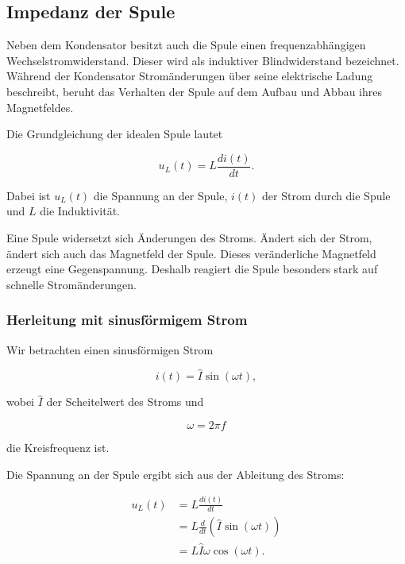 \subsection{Impedanz der Spule}
\label{subsec:impedanz-der-spule}

Neben dem Kondensator besitzt auch die Spule einen frequenzabhängigen
Wechselstromwiderstand. Dieser wird als induktiver Blindwiderstand bezeichnet.
Während der Kondensator Stromänderungen über seine elektrische Ladung beschreibt,
beruht das Verhalten der Spule auf dem Aufbau und Abbau ihres Magnetfeldes.

Die Grundgleichung der idealen Spule lautet

\begin{equation}
	u_L(t) = L \frac{di(t)}{dt}.
	\label{eq:spule-grundgleichung}
\end{equation}

Dabei ist \(u_L(t)\) die Spannung an der Spule, \(i(t)\) der Strom durch die
Spule und \(L\) die Induktivität.

\begin{PhysicsBox}
	\label{box:grundidee-der-spule}
	Eine Spule widersetzt sich Änderungen des Stroms. Ändert sich der Strom,
	ändert sich auch das Magnetfeld der Spule. Dieses veränderliche Magnetfeld
	erzeugt eine Gegenspannung. Deshalb reagiert die Spule besonders stark auf
	schnelle Stromänderungen.
\end{PhysicsBox}

\subsubsection{Herleitung mit sinusförmigem Strom}
\label{subsubsec:spule-sinusfoermiger-strom}

Wir betrachten einen sinusförmigen Strom

\begin{equation}
	i(t) = \hat{I} \sin(\omega t),
	\label{eq:spule-strom-sinus}
\end{equation}

wobei \(\hat{I}\) der Scheitelwert des Stroms und

\begin{equation}
	\omega = 2\pi f
	\label{eq:kreisfrequenz-spule}
\end{equation}

die Kreisfrequenz ist.

Die Spannung an der Spule ergibt sich aus der Ableitung des Stroms:

\begin{align}
	u_L(t)
	&= L \frac{di(t)}{dt} \\[4pt]
	&= L \frac{d}{dt} \left( \hat{I} \sin(\omega t) \right) \\[4pt]
	&= L \hat{I} \omega \cos(\omega t).
	\label{eq:spule-spannung-cosinus}
\end{align}

